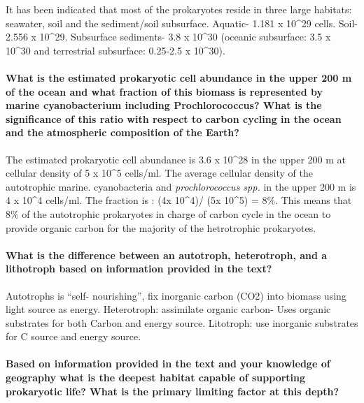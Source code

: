 \documentclass[]{article}
\let\oldparagraph\paragraph
\renewcommand{\paragraph}[1]{\oldparagraph{#1}\mbox{}}
\begin{document}
It has been indicated that most of the prokaryotes reside in three large
habitats: seawater, soil and the sediment/soil subsurface. Aquatic-
1.181 x 10\^{}29 cells. Soil- 2.556 x 10\^{}29. Subsurface sediments-
3.8 x 10\^{}30 (oceanic subsurface: 3.5 x 10\^{}30 and terrestrial
subsurface: 0.25-2.5 x 10\^{}30).

\paragraph{What is the estimated prokaryotic cell abundance in the upper
200 m of the ocean and what fraction of this biomass is represented by
marine cyanobacterium including Prochlorococcus? What is the
significance of this ratio with respect to carbon cycling in the ocean
and the atmospheric composition of the
Earth?}\label{what-is-the-estimated-prokaryotic-cell-abundance-in-the-upper-200-m-of-the-ocean-and-what-fraction-of-this-biomass-is-represented-by-marine-cyanobacterium-including-prochlorococcus-what-is-the-significance-of-this-ratio-with-respect-to-carbon-cycling-in-the-ocean-and-the-atmospheric-composition-of-the-earth}

The estimated prokaryotic cell abundance is 3.6 x 10\^{}28 in the upper
200 m at cellular density of 5 x 10\^{}5 cells/ml. The average cellular
density of the autotrophic marine. cyanobacteria and
\emph{prochlorococcus spp.} in the upper 200 m is 4 x 10\^{}4 cells/ml.
The fraction is : (4x 10\^{}4)/ (5x 10\^{}5) = 8\%. This means that 8\%
of the autotrophic prokaryotes in charge of carbon cycle in the ocean to
provide organic carbon for the majority of the hetrotrophic prokaryotes.

\paragraph{What is the difference between an autotroph, heterotroph, and
a lithotroph based on information provided in the
text?}\label{what-is-the-difference-between-an-autotroph-heterotroph-and-a-lithotroph-based-on-information-provided-in-the-text}

Autotrophs is ``self- nourishing'', fix inorganic carbon (CO2) into
biomass using light source as energy. Heterotroph: assimilate organic
carbon- Uses organic substrates for both Carbon and energy source.
Litotroph: use inorganic substrates for C source and energy source.

\paragraph{Based on information provided in the text and your knowledge
of geography what is the deepest habitat capable of supporting
prokaryotic life? What is the primary limiting factor at this
depth?}\label{based-on-information-provided-in-the-text-and-your-knowledge-of-geography-what-is-the-deepest-habitat-capable-of-supporting-prokaryotic-life-what-is-the-primary-limiting-factor-at-this-depth}
\end{document}
